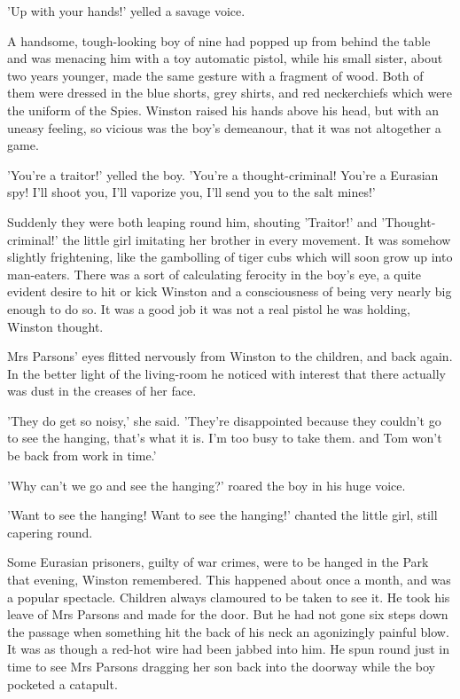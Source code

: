 \documentclass{article}
\begin{document}
'Up with your hands!' yelled a savage voice.

A handsome, tough-looking boy of nine had popped up from behind the table
and was menacing him with a toy automatic pistol, while his small sister,
about two years younger, made the same gesture with a fragment of wood.
Both of them were dressed in the blue shorts, grey shirts, and red
neckerchiefs which were the uniform of the Spies. Winston raised his hands
above his head, but with an uneasy feeling, so vicious was the boy's
demeanour, that it was not altogether a game.

'You're a traitor!' yelled the boy. 'You're a thought-criminal! You're a
Eurasian spy! I'll shoot you, I'll vaporize you, I'll send you to the salt
mines!'

Suddenly they were both leaping round him, shouting 'Traitor!' and
'Thought-criminal!' the little girl imitating her brother in every
movement. It was somehow slightly frightening, like the gambolling of
tiger cubs which will soon grow up into man-eaters. There was a sort of
calculating ferocity in the boy's eye, a quite evident desire to hit or
kick Winston and a consciousness of being very nearly big enough to do so.
It was a good job it was not a real pistol he was holding, Winston thought.

Mrs Parsons' eyes flitted nervously from Winston to the children, and back
again. In the better light of the living-room he noticed with interest
that there actually was dust in the creases of her face.

'They do get so noisy,' she said. 'They're disappointed because they
couldn't go to see the hanging, that's what it is. I'm too busy to take
them. and Tom won't be back from work in time.'

'Why can't we go and see the hanging?' roared the boy in his huge voice.

'Want to see the hanging! Want to see the hanging!' chanted the little
girl, still capering round.

Some Eurasian prisoners, guilty of war crimes, were to be hanged in the
Park that evening, Winston remembered. This happened about once a month,
and was a popular spectacle. Children always clamoured to be taken to see
it. He took his leave of Mrs Parsons and made for the door. But he had not
gone six steps down the passage when something hit the back of his neck an
agonizingly painful blow. It was as though a red-hot wire had been jabbed
into him. He spun round just in time to see Mrs Parsons dragging her son
back into the doorway while the boy pocketed a catapult.
\end{document}
